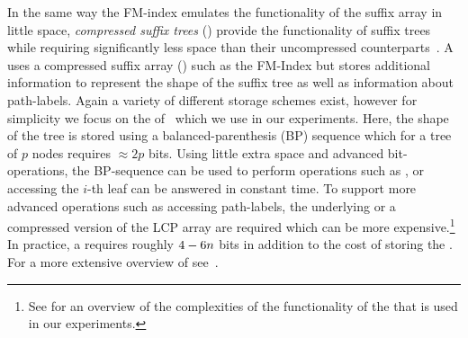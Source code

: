 In the same way the FM-index emulates the functionality of the suffix array in
little space, {\it compressed suffix trees} (\CST) provide the functionality
of suffix trees while requiring significantly less space than their uncompressed
counterparts~\cite{ofg-spire10}. A \CST uses a compressed suffix array (\CSA) such
as the FM-Index but stores additional information to represent the shape of
the suffix tree as well as information about path-labels. Again a variety
of different storage schemes exist, however for simplicity we focus on
the \CST of~ which we use in our experiments. Here, the 
shape of the tree is stored using a balanced-parenthesis (BP) sequence which 
for a tree of $p$ nodes requires $\approx 2p$ bits. Using little extra space
and advanced bit-operations, the BP-sequence can be used to perform 
operations such as ,  or 
accessing the $i$-th leaf can be answered in constant time.
To support more advanced operations such as accessing path-labels,
the underlying \CSA or a compressed version of the LCP array are required
which can be more expensive.\footnote{See \supp for an overview of the complexities
of the functionality of the \CST that is used in our experiments.} 
In practice, a \CST requires roughly $4-6n$ bits in addition to the
cost of storing the \CSA. For a more extensive overview of \CSTs see~.
